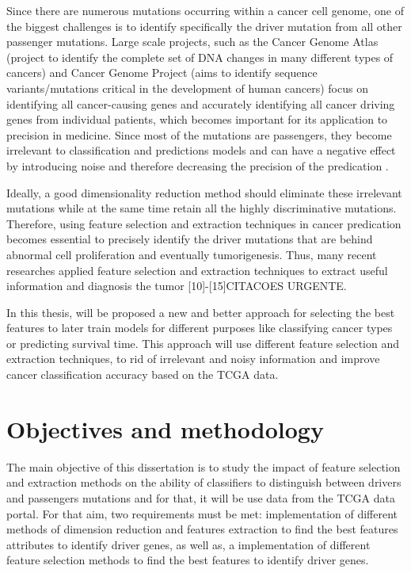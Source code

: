 Since there are numerous mutations occurring within a cancer cell genome, one of the biggest challenges is to identify specifically the driver mutation from all other passenger mutations. Large scale projects, such as the Cancer Genome Atlas (project to identify the complete set of DNA changes in many different types of cancers) and Cancer Genome Project (aims to identify sequence variants/mutations critical in the development of human cancers) focus on identifying all cancer-causing genes and accurately identifying all cancer driving genes from individual patients, which becomes important for its application to precision in medicine. Since most of the mutations are passengers, they become irrelevant to classification and predictions models and can have a negative effect by introducing noise and therefore decreasing the precision of the predication \cite{Li}.   

Ideally, a good dimensionality reduction method should eliminate these irrelevant mutations while at the same time retain all the highly discriminative mutations. Therefore, using feature selection and extraction techniques in cancer predication becomes essential to precisely identify the driver mutations that are behind abnormal cell proliferation and eventually tumorigenesis. Thus, many recent researches applied feature selection and extraction techniques to extract useful information and diagnosis the tumor [10]-[15]CITACOES URGENTE.

In this thesis, will be proposed a new and better approach for selecting the best features to later train models for different purposes like classifying cancer types or predicting survival time. This approach will use different feature selection and extraction techniques, to rid of irrelevant and noisy information and improve cancer classification accuracy based on the \gls{TCGA} data. 
 
\section{Objectives and methodology}
\label{objectives_and_methodology}
\hspace{10px}The main objective of this dissertation is to study the impact of feature selection and extraction methods on the ability of classifiers to distinguish between drivers and passengers mutations and for that, it will be use data from the TCGA data portal. For that aim, two requirements must be met: implementation of different methods of dimension reduction and features extraction to find the best features attributes to identify driver genes, as well as, a implementation of  different feature selection methods to find the best features to identify driver genes.

